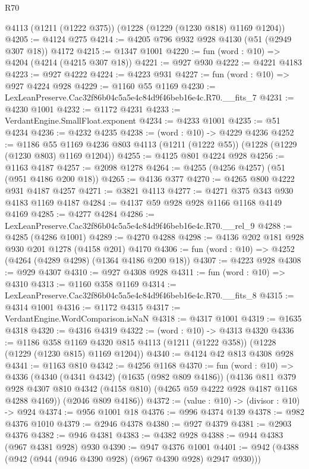 \begin{lexlean}{R70}
\begin{coremodule}
    @4113
    (@1211 (@1222 @375))
    (@1228 (@1229 (@1230 @818) @1169 @1204))
@4205 := @4124 @275
@4214 := @4205 @796 @932 @928 @4130 (@51 (@2949 @307 @18)) @4172
@4215 := @1347 @1001
@4220 := fun (word : @10) => @4204 (@4214 (@4215 @307 @18))
@4221 := @927 @930
@4222 := @4221 @4183
@4223 := @927 @4222
@4224 := @4223 @931
@4227 := fun (word : @10) => @927 @4224 @928
@4229 := @1160 @55 @1169
@4230 := LexLeanPreserve.Cac32f86b04c5a5e4c84d9f46beb16e4c.R70.__fits_7
@4231 := @4230 @1001
@4232 := @1172 @4231
@4233 := VerdantEngine.SmallFloat.exponent
@4234 := @4233 @1001
@4235 := @51 @4234
@4236 := @4232 @4235
@4238 := (word : @10) -> @4229 @4236
@4252 := @1186
    @55
    @1169
    @4236
    @803
    @4113
    (@1211 (@1222 @55))
    (@1228 (@1229 (@1230 @803) @1169 @1204))
@4255 := @4125 @801 @4224 @928
@4256 := @1163 @4187
@4257 := @2098 @1278
@4264 := @4255 (@4256 @4257) (@51 (@951 @4186 @200 @18))
@4265 := @4136 @377
@4270 := @4265 @800 @4222 @931 @4187 @4257
@4271 := @3821 @4113
@4277 := @4271 @375 @343 @930 @4183 @1169 @4187
@4284 := @4137 @59 @928 @928 @1166 @1168 @4149 @4169
@4285 := @4277 @4284
@4286 := LexLeanPreserve.Cac32f86b04c5a5e4c84d9f46beb16e4c.R70.__rel_9
@4288 := @4285 (@4286 @1001)
@4289 := @4270 @4288
@4298 := @4136 @202 @181 @928 @930 @201 @1278 (@4158 @201) @4170
@4306 := fun (word : @10) => @4252 (@4264 (@4289 @4298) (@1364 @4186 @200 @18))
@4307 := @4223 @928
@4308 := @929 @4307
@4310 := @927 @4308 @928
@4311 := fun (word : @10) => @4310
@4313 := @1160 @358 @1169
@4314 := LexLeanPreserve.Cac32f86b04c5a5e4c84d9f46beb16e4c.R70.__fits_8
@4315 := @4314 @1001
@4316 := @1172 @4315
@4317 := VerdantEngine.WordComparison.isNaN
@4318 := @4317 @1001
@4319 := @1635 @4318
@4320 := @4316 @4319
@4322 := (word : @10) -> @4313 @4320
@4336 := @1186
    @358
    @1169
    @4320
    @815
    @4113
    (@1211 (@1222 @358))
    (@1228 (@1229 (@1230 @815) @1169 @1204))
@4340 := @4124 @42 @813 @4308 @928
@4341 := @1163 @810
@4342 := @4256 @1168
@4370 := fun (word : @10) =>
  @4336
    (@4340
      (@4341 @4342)
      (@1635 (@982 @809 @4186))
      (@4136
        @811
        @379
        @928
        @4307
        @810
        @4342
        (@4158 @810)
        (@4265 @59 @4222 @928 @4187 @1168 @4288 @4169))
      (@2046 @809 @4186))
@4372 := (value : @10) -> (divisor : @10) -> @924
@4374 := @956 @1001 @18
@4376 := @996 @4374 @139
@4378 := @982 @4376 @1010
@4379 := @2946 @4378
@4380 := @927 @4379
@4381 := @2903 @4376
@4382 := @946 @4381
@4383 := @4382 @928
@4388 := @944 @4383 (@967 @4381 @928) @930
@4390 := @947 @4376 @1001
@4401 := @942 (@4388 (@942 (@944 (@946 @4390 @928) (@967 @4390 @928) @2947 @930)))

\end{coremodule}
\end{lexlean}
